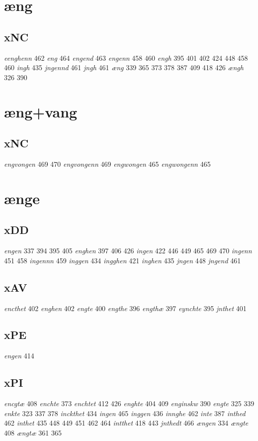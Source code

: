 \documentclass[a4paper,twocolumn]{article}
\begin{document}
\section{æng}
\label{sec:org3012f22}
\subsection{xNC}
\label{sec:orgf08065b}
\emph{eenghenn} 462 \emph{eng} 464 \emph{engend} 463 \emph{engenn} 458 460 \emph{engh} 395 401 402 424 448 458 460 \emph{ingh} 435 \emph{jngennd} 461 \emph{jngh} 461 \emph{æng} 339 365 373 378 387 409 418 426 \emph{ængh} 326 390 
\section{æng+vang}
\label{sec:orgab8ae59}
\subsection{xNC}
\label{sec:orgf6f03a5}
\emph{engvongen} 469 470 \emph{engvongenn} 469 \emph{engwongen} 465 \emph{engwongenn} 465 
\section{ænge}
\label{sec:org5ce17cc}
\subsection{xDD}
\label{sec:org8751422}
\emph{engen} 337 394 395 405 \emph{enghen} 397 406 426 \emph{ingen} 422 446 449 465 469 470 \emph{ingenn} 451 458 \emph{ingennn} 459 \emph{inggen} 434 \emph{ingghen} 421 \emph{inghen} 435 \emph{jngen} 448 \emph{jngend} 461 
\subsection{xAV}
\label{sec:orgbed55ef}
\emph{encthet} 402 \emph{enghen} 402 \emph{engte} 400 \emph{engthe} 396 \emph{engthæ} 397 \emph{eynchte} 395 \emph{jnthet} 401 
\subsection{xPE}
\label{sec:orgec51f4a}
\emph{engen} 414 
\subsection{xPI}
\label{sec:orgfd44810}
\emph{encgtæ} 408 \emph{enchte} 373 \emph{enchtet} 412 426 \emph{enghte} 404 409 \emph{enginskw} 390 \emph{engte} 325 339 \emph{enkte} 323 337 378 \emph{inckthet} 434 \emph{ingen} 465 \emph{inggen} 436 \emph{innghe} 462 \emph{inte} 387 \emph{inthed} 462 \emph{inthet} 435 448 449 451 462 464 \emph{intthet} 418 443 \emph{jnthedt} 466 \emph{ængen} 334 \emph{ængte} 408 \emph{ængtæ} 361 365 
\end{document}
